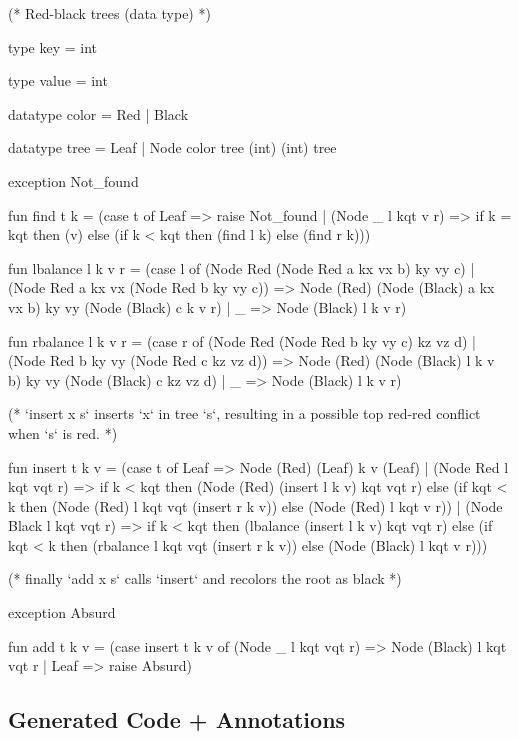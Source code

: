 \begin{cakeml}

(* Red-black trees (data type) *)

type key = int

type value = int

datatype color = Red | Black

datatype tree = Leaf | Node color tree (int) (int) tree

exception Not_found



fun find t k =
  (case t of
    Leaf => raise Not_found
  | (Node _ l kqt v r) =>
    if k = kqt then (v)  else (if k < kqt then (find l k)  else (find r k)))

fun lbalance l k v r =
  (case l of
    (Node Red (Node Red a kx vx b) ky vy c) | (Node Red a kx vx (Node Red b
    ky vy c)) =>
    Node (Red) (Node (Black) a kx vx b) ky vy (Node (Black) c k v r)
  | _ => Node (Black) l k v r)

fun rbalance l k v r =
  (case r of
    (Node Red (Node Red b ky vy c) kz vz d) | (Node Red b ky vy (Node Red c
    kz vz d)) =>
    Node (Red) (Node (Black) l k v b) ky vy (Node (Black) c kz vz d)
  | _ => Node (Black) l k v r)

(* `insert x s` inserts `x` in tree `s`, resulting in a possible top red-red
     conflict when `s` is red. *)

fun insert t k v =
  (case t of
    Leaf => Node (Red) (Leaf) k v (Leaf)
  | (Node Red l kqt vqt r) =>
    if k < kqt then (Node (Red) (insert l k v) kqt vqt r) 
    else (if kqt < k then (Node (Red) l kqt vqt (insert r k v)) 
          else (Node (Red) l kqt v r))
  | (Node Black l kqt vqt r) =>
    if k < kqt then (lbalance (insert l k v) kqt vqt r) 
    else (if kqt < k then (rbalance l kqt vqt (insert r k v)) 
          else (Node (Black) l kqt v r)))


(* finally `add x s` calls `insert` and recolors the root as black *)

exception Absurd

fun add t k v =
  (case insert t k v of
    (Node _ l kqt vqt r) => Node (Black) l kqt vqt r
  | Leaf => raise Absurd)
\end{cakeml}

\subsection{Generated \cml Code + \gospel Annotations}
\label{subsec:Red_Black_Trees_Cakeml_Gospel}

